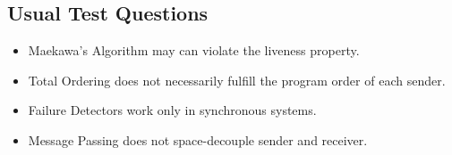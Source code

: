 \subsection{Usual Test Questions}

\begin{itemize}
    \item Maekawa's Algorithm may can violate the liveness property.
    \item Total Ordering does not necessarily fulfill the program order of each sender.
    \item Failure Detectors work only in synchronous systems.
    \item Message Passing does not space-decouple sender and receiver.
\end{itemize}
